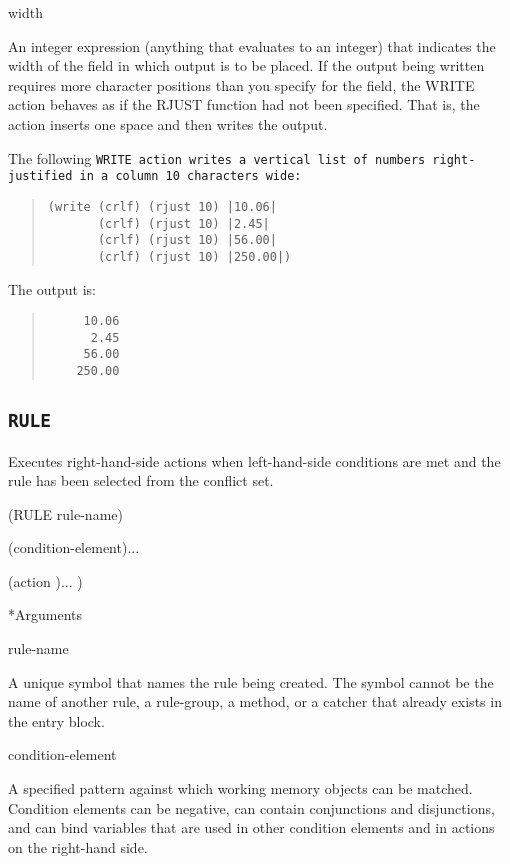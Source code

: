 {{width

An integer expression (anything that evaluates to an integer)
that indicates the width of the field in which output is to
be placed. If the output being written requires more
character positions than you specify for the field, the WRITE
action behaves as if the RJUST function had not been
specified. That is, the action inserts one space and then
writes the output.

\Example

The following \tt{WRITE} action writes a vertical list of numbers
right-justified in a column 10 characters wide:

\begin{quote}
\begin{verbatim}
(write (crlf) (rjust 10) |10.06|
       (crlf) (rjust 10) |2.45|
       (crlf) (rjust 10) |56.00|
       (crlf) (rjust 10) |250.00|)
\end{verbatim}
\end{quote}

The output is:

\begin{quote}
\begin{verbatim}
     10.06
      2.45
     56.00
    250.00
\end{verbatim}
\end{quote}  

\subsection{\tt{RULE}}

Executes right-hand-side actions when left-hand-side
conditions are met and the rule has been selected from the
conflict set.

\Format

(RULE rule-name)

(condition-element)...

(action )... )

*Arguments

rule-name

A unique symbol that names the rule being created. The symbol
cannot be the name of another rule, a rule-group, a method,
or a catcher that already exists in the entry block.

condition-element

A specified pattern against which working memory objects can
be matched. Condition elements can be negative, can contain
conjunctions and disjunctions, and can bind variables that
are used in other condition elements and in actions on the
right-hand side.

}}
